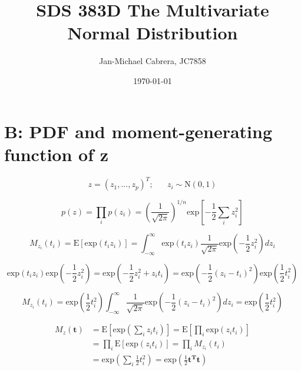 \documentclass[12pt]{article}
\begin{document}
    \title{SDS 383D The Multivariate Normal Distribution}
    \author{Jan-Michael Cabrera, JC7858}
    \date{\today}
    \maketitle

    \section*{B: PDF and moment-generating function of z}

        \begin{equation}
            z = (z_1,...,z_p)^T; \hspace{20pt} z_i \sim \text{N}(0,1)
        \end{equation}

        \begin{equation}
          p(z) = \prod_i p(z_i) = \left ( \frac{1}{\sqrt{2 \pi}}\right)^{1/n} \text{exp}\left[  -\frac{1}{2}\sum_i z_i^2 \right]
        \end{equation}

        \begin{equation}
            M_{z_i}(t_i) = \text{E}[\text{exp}(t_i z_i)] = \int_{-\infty}^\infty \text{exp}(t_i z_i) \frac{1}{\sqrt{2 \pi}} \text{exp}\left( -\frac{1}{2} z_i^2 \right) dz_i
        \end{equation}

        \begin{equation}
            \text{exp}(t_i z_i) \text{exp}\left( -\frac{1}{2} z_i^2 \right) = \text{exp}\left( -\frac{1}{2} z_i^2 + z_i t_i\right) = \text{exp}\left( -\frac{1}{2}(z_i - t_i)^2 \right) \text{exp} \left (\frac{1}{2} t_i^2 \right)
        \end{equation}

        \begin{equation}
            M_{z_i}(t_i) = \text{exp}\left( \frac{1}{2} t_i^2\right) \int_{-\infty}^{\infty} \frac{1}{\sqrt{2\pi}} \text{exp}\left( - \frac{1}{2} (z_i - t_i)^2\right) dz_i = \text{exp}\left( \frac{1}{2}t_i^2 \right )
        \end{equation}

        \begin{align}
            M_z(\mathbf{t}) &= \text{E}\left[\text{exp}\left(\sum_i z_i t_i\right)\right] = \text{E}\left[ \prod_i \text{exp}(z_i t_i)\right]\\
            &= \prod_i \text{E}[\text{exp}(z_i t_i)] = \prod_i M_{z_i}(t_i)\\
            &= \text{exp}\left( \sum_i \frac{1}{2} t_i^2 \right) = \text{exp}\left ( \frac{1}{2} \mathbf{t^Tt}\right)
        \end{align}
\end{document}
